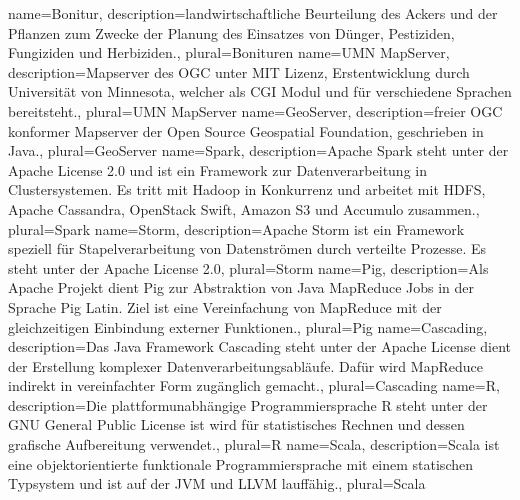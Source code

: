 {
  name=Bonitur,
  description={landwirtschaftliche Beurteilung des Ackers und der Pflanzen zum Zwecke der Planung des Einsatzes von Dünger, Pestiziden, Fungiziden und Herbiziden.},
  plural=Bonituren
}
{
  name=UMN MapServer,
  description={Mapserver des OGC unter MIT Lizenz, Erstentwicklung durch Universität von Minnesota, welcher als CGI Modul und für verschiedene Sprachen  bereitsteht.},
  plural=UMN MapServer
}
{
  name=GeoServer,
  description={freier OGC konformer Mapserver der Open Source Geospatial Foundation, geschrieben in Java.},
  plural=GeoServer
}
{
  name=Spark,
  description={Apache Spark steht unter der Apache License 2.0 und ist ein Framework zur Datenverarbeitung in Clustersystemen. Es tritt mit Hadoop in Konkurrenz und arbeitet mit HDFS, Apache Cassandra, OpenStack Swift, Amazon S3 und Accumulo zusammen.},
  plural=Spark
}
{
  name=Storm,
  description={Apache Storm ist ein Framework speziell für Stapelverarbeitung von Datenströmen durch verteilte Prozesse. Es steht unter der Apache License 2.0},
  plural=Storm
}
{
  name=Pig,
  description={Als Apache Projekt dient Pig zur Abstraktion von Java MapReduce Jobs in der Sprache Pig Latin. Ziel ist eine Vereinfachung von MapReduce mit der gleichzeitigen Einbindung externer Funktionen.},
  plural=Pig
}
{
  name=Cascading,
  description={Das Java Framework Cascading steht unter der Apache License dient der Erstellung komplexer Datenverarbeitungsabläufe. Dafür wird MapReduce indirekt in vereinfachter Form zugänglich gemacht.},
  plural=Cascading
}
{
  name=R,
  description={Die plattformunabhängige Programmiersprache R steht unter der GNU General Public License ist wird für statistisches Rechnen und dessen grafische Aufbereitung verwendet.},
  plural=R
}
{
  name=Scala,
  description={Scala ist eine objektorientierte funktionale Programmiersprache mit einem statischen Typsystem und ist auf der JVM und LLVM lauffähig.},
  plural=Scala
}